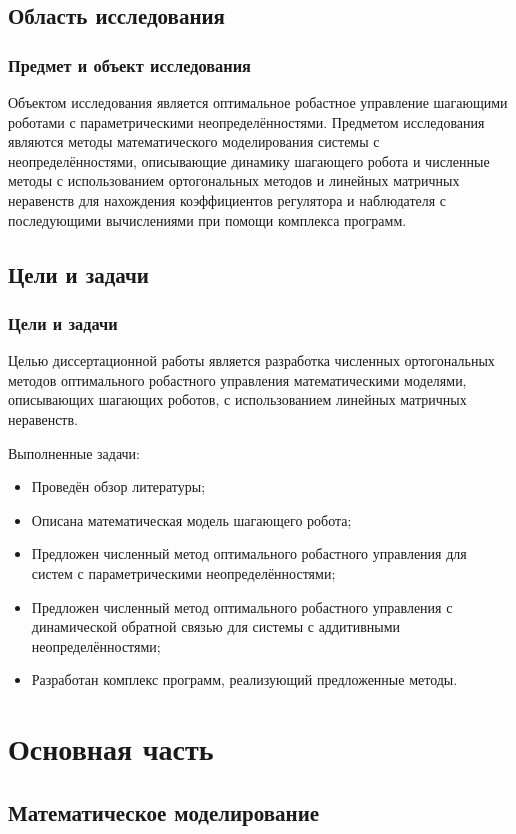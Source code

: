 \subsection{Область исследования}

\begin{frame}
    \frametitle{Предмет и объект исследования}
	Объектом исследования является оптимальное робастное управление шагающими роботами с параметрическими неопределённостями.
	\vfill
	Предметом исследования являются методы математического моделирования системы с неопределённостями, описывающие динамику шагающего робота и численные методы с использованием ортогональных методов и линейных матричных неравенств для нахождения коэффициентов регулятора и наблюдателя с последующими вычислениями при помощи комплекса программ.
\end{frame}

\subsection{Цели и задачи}

\begin{frame}
    \frametitle{Цели и задачи}
    Целью диссертационной работы является разработка численных ортогональных методов оптимального робастного управления математическими моделями, описывающих шагающих роботов, с использованием линейных матричных неравенств.
    
	Выполненные задачи:
	\begin{itemize}
		\item Проведён обзор литературы;
		\item Описана математическая модель шагающего робота;
		\item Предложен численный метод оптимального робастного управления для систем с параметрическими неопределённостями;
		\item Предложен численный метод оптимального робастного управления с динамической обратной связью для системы с аддитивными неопределённостями;
		\item Разработан комплекс программ, реализующий предложенные методы.
	\end{itemize}
\end{frame}

\section{Основная часть}

\subsection{Математическое моделирование}

